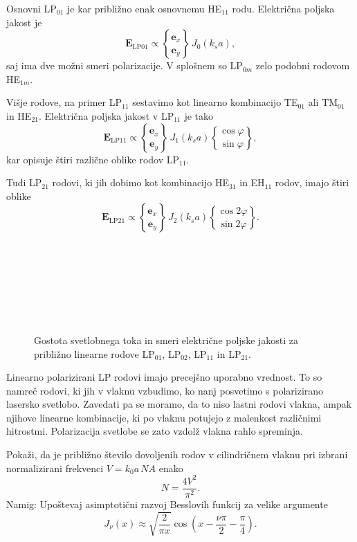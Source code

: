 Osnovni LP$_{01}$ je kar približno enak osnovnemu HE$_{11}$ rodu. Električna poljska jakost je 
\begin{equation}
\mathbf{E}_\mathrm{LP01} \propto { \mathbf{e}_x \brace \mathbf{e}_y} \, J_0(k_s a),
\end{equation}
saj ima dve možni smeri polarizacije. V splošnem so LP$_{0m}$ zelo podobni rodovom HE$_{1m}$. 

Višje rodove, na primer LP$_{11}$ sestavimo kot linearno kombinacijo 
TE$_{01}$ ali TM$_{01}$ in HE$_{21}$.
Električna poljska jakost v LP$_{11}$ je tako 
\begin{equation}
\mathbf{E}_\mathrm{LP11} \propto { \mathbf{e}_x \brace \mathbf{e}_y} \, J_1(k_s a)
{ \cos\varphi \brace \sin\varphi},
\end{equation}
kar opisuje štiri različne oblike rodov LP$_{11}$.

Tudi LP$_{21}$ rodovi, ki jih dobimo kot kombinacijo HE$_{31}$
in EH$_{11}$ rodov, imajo štiri oblike
\begin{equation}
\mathbf{E}_\mathrm{LP21} \propto { \mathbf{e}_x \brace \mathbf{e}_y} \, J_2(k_s a)
{ \cos 2\varphi \brace \sin 2\varphi}.
\end{equation}
\begin{figure}[h!]
\centering
\def\svgwidth{93truemm} 
 \\
\def\svgwidth{93truemm} 
 \\
\def\svgwidth{93truemm} 
 \\
\def\svgwidth{93truemm} 
 \\
\def\svgwidth{93truemm} 
 \\
\def\svgwidth{93truemm} 
 \\
\caption{Gostota svetlobnega toka in smeri električne poljske jakosti za približno linearne rodove
LP$_{01}$, LP$_{02}$, LP$_{11}$ in LP$_{21}$.}
\label{fig:LP}
\end{figure}
Linearno polarizirani LP rodovi imajo precejšno uporabno vrednost. To so 
namreč rodovi, ki jih v vlaknu vzbudimo, ko nanj posvetimo s polarizirano 
lasersko svetlobo. Zavedati pa se moramo, da to niso lastni rodovi vlakna, 
ampak njihove linearne kombinacije, ki po vlaknu potujejo z malenkost različnimi
hitrostmi. Polarizacija svetlobe se zato vzdolž vlakna rahlo spreminja.

\begin{definition}
Pokaži, da je približno število dovoljenih rodov v cilindričnem vlaknu pri 
izbrani normalizirani frekvenci $V = k_0a\, NA $ enako
\begin{equation} 
N = \frac{4 V^2}{\pi^2}.
\end{equation}
Namig: Upoštevaj asimptotični razvoj Besslovih funkcij za velike argumente
\begin{equation}
J_\nu(x) \approx \sqrt{\frac{2}{\pi x}}\cos\left(x - \frac{\nu \pi }{2}- \frac{\pi}{4}\right).
\end{equation}
\end{definition}

